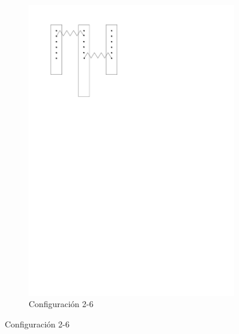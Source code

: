 \begin{figure}[htbp!]
\begin{subfigure}[b]{0.3\textwidth}
    \includegraphics[width=\linewidth]{./Figures/26.pdf}
    \caption{Configuraci\'on 2-6}
    \label{fig:conf-2-6}
  \end{subfigure}

  \vspace{0.5cm} %


\end{figure}
